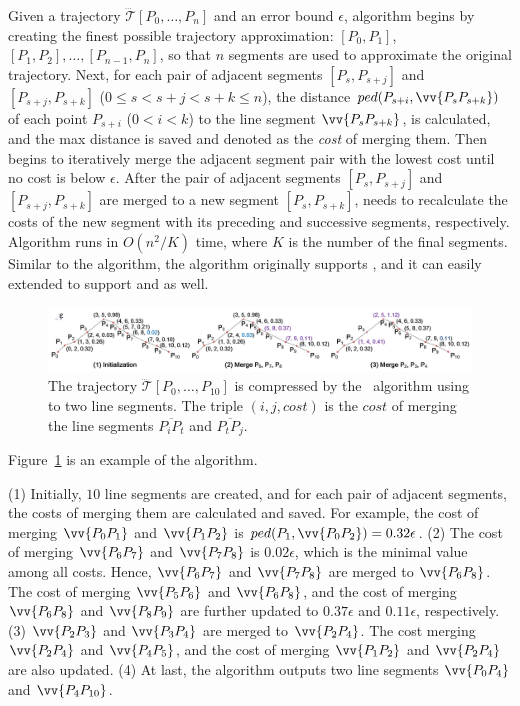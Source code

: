 Given a trajectory $\dddot{\mathcal{T}}[P_0, \ldots, P_n]$ and an error bound $\epsilon$,
algorithm \tpa begins by creating the finest possible  trajectory approximation: $[P_0, P_1]$, $[P_1, P_2], \ldots,[P_{n-1}, P_n]$, so that $n$ segments are used to approximate the original trajectory.
Next, for each pair of adjacent segments $[P_{s}, P_{s+j}]$ and $[P_{s+j}, P_{s+k}]$ ($0\le s<s+j < s+k \le n$),
the  distance $ped(P_{s+i}, \vv{P_sP_{s+k}})$ of each point $P_{s+i}$ ($0<i<k$) to the line segment $\vv{P_sP_{s+k}}$, is calculated, and the max distance is saved and denoted as the \emph{cost} of merging them.
Then \tpa begins to iteratively merge the adjacent segment pair with the lowest cost
until no cost is below $\epsilon$.
After the pair of adjacent segments $[P_{s}, P_{s+j}]$ and $[P_{s+j}, P_{s+k}]$ are merged to a new segment $[P_{s}, P_{s+k}]$, \tpa needs to recalculate the costs of the new segment with its preceding and successive segments, respectively.
%
Algorithm \tpa runs in $O(n^2/K)$ time, where $K$ is the number of the final segments.
Similar to the \dpa algorithm, the \tpa algorithm originally supports \ped, and it can easily extended to support \sed and \dad as well.

\begin{figure}[tb!]
	\centering
	\includegraphics[scale=0.425]{Figures/Fig-pavlidis.jpg}\vspace{-1ex}
	\caption{\small The trajectory $\dddot{\mathcal{T}}[P_0, \ldots, P_{10}]$ is compressed by the \pavlidis~algorithm using \ped to two line segments. The triple $(i, j, cost)$ is the $cost$ of merging the line segments $\overline{P_iP_t}$ and $\overline{P_tP_j}$.}	\vspace{-2ex}
	\label{fig:pavlidis}
\end{figure}

\begin{example}
	\label{exm-alg-pavlidis}
	Figure~\ref{fig:pavlidis} is an example of the \tpa algorithm.
	
	\ni (1) Initially, $10$ line segments are created, and for each pair of adjacent segments, the costs of merging them are calculated and saved. For example, the cost of merging $\vv{P_0P_1}$ and $\vv{P_1P_2}$ is $ped(P_{1}, \vv{P_0P_{2}}) = 0.32\epsilon$.
	(2) The cost of merging $\vv{P_6P_7}$ and $\vv{P_7P_8}$ is $0.02\epsilon$, which is the minimal value among all costs. Hence, $\vv{P_6P_7}$ and $\vv{P_7P_8}$ are merged to $\vv{P_6P_8}$. The cost of merging $\vv{P_5P_6}$ and $\vv{P_6P_8}$, and the cost of merging $\vv{P_6P_8}$ and $\vv{P_8P_9}$ are further updated to $0.37\epsilon$ and $0.11\epsilon$, respectively.
	(3) $\vv{P_2P_3}$ and $\vv{P_3P_4}$ are merged to $\vv{P_2P_4}$. The cost merging $\vv{P_2P_4}$ and $\vv{P_4P_5}$, and the cost of merging $\vv{P_1P_2}$ and $\vv{P_2P_4}$ are also updated.
	(4) At last, the algorithm outputs two line segments $\vv{P_0P_4}$ and $\vv{P_4P_{10}}$.
\end{example}



